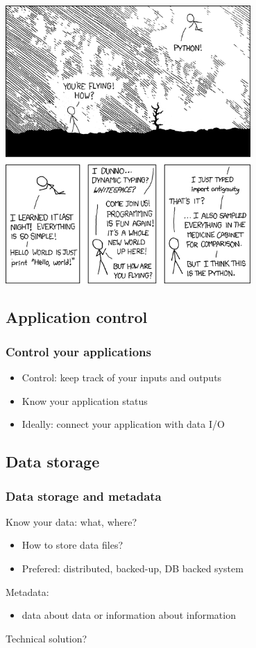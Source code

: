 \documentclass[14pt,notes]{beamer}
\begin{document}
\begin{frame}
\centering
\includegraphics[width=0.7\textwidth]{python}

\end{frame}

\subsection{Application control}
\begin{frame}
\frametitle{Control your applications}
\begin{itemize}
\item Control: keep track of your inputs and outputs
\item Know your application status
\item Ideally: connect your application with data I/O
\end{itemize}
\end{frame}

\subsection{Data storage}
\begin{frame}
\frametitle{Data storage and metadata}
Know your data: what, where?
\begin{itemize}
\item How to store data files?
\item Prefered: distributed, backed-up, DB backed system
\end{itemize}
Metadata:
\begin{itemize}
\item data about data or information about information
\end{itemize}
Technical solution?
\end{frame}
\end{document}
